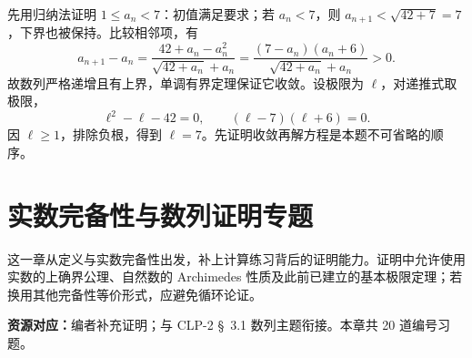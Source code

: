 \documentclass[12pt,fontset=fandol]{ctexart}
\begin{document}
\begin{solve}\label{ans:c1q24}
先用归纳法证明 $1\le a_n<7$：初值满足要求；若 $a_n<7$，则 $a_{n+1}<\sqrt{42+7}=7$，下界也被保持。比较相邻项，有
\[
a_{n+1}-a_n=\frac{42+a_n-a_n^2}{\sqrt{42+a_n}+a_n}=\frac{(7-a_n)(a_n+6)}{\sqrt{42+a_n}+a_n}>0.
\]
故数列严格递增且有上界，单调有界定理保证它收敛。设极限为 $\ell$，对递推式取极限，
\[
\ell^2-\ell-42=0,\qquad(\ell-7)(\ell+6)=0.
\]
因 $\ell\ge1$，排除负根，得到 $\ell=7$。先证明收敛再解方程是本题不可省略的顺序。
\end{solve}

\clearpage
\section{实数完备性与数列证明专题}\label{sec:ch2}
这一章从定义与实数完备性出发，补上计算练习背后的证明能力。证明中允许使用实数的上确界公理、自然数的 Archimedes 性质及此前已建立的基本极限定理；若换用其他完备性等价形式，应避免循环论证。

\textbf{资源对应：}编者补充证明；与 CLP-2 \S~3.1 数列主题衔接。本章共 20 道编号习题。
\end{document}
